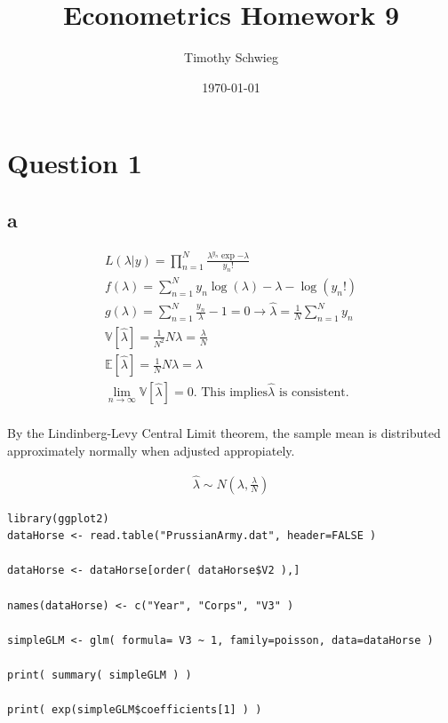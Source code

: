 \documentclass[11pt]{article}
\author{Timothy Schwieg}
\date{\today}
\title{Econometrics Homework 9}
\begin{document}
\maketitle
\section{Question 1}
\label{sec-1}
\subsection{a}
\label{sec-1-1}
\begin{align*}
L( \lambda | y ) = \prod_{n=1}^N \frac{  \lambda^{y_n} \exp{ - \lambda } }{ y_n ! }\\
f( \lambda ) = \sum_{n=1}^N y_n \log( \lambda ) - \lambda - \log( y_n ! )\\
g( \lambda ) = \sum_{n=1}^N \frac{ y_n }{ \lambda } - 1 = 0 \to \hat{\lambda} = \frac{1}{N} \sum_{n=1}^N y_n \\
\mathbb{V}[\hat{\lambda}] = \frac{1}{N^2} N \lambda = \frac{\lambda}{N}\\
\mathbb{E}[\hat{\lambda}] = \frac{1}{N} N \lambda = \lambda\\
\lim_{n \to \infty} \mathbb{V}[\hat{\lambda}] = 0. \text{ This implies
}\hat{\lambda}\text{ is consistent.}\\
\end{align*}

By the Lindinberg-Levy Central Limit theorem, the sample mean is
distributed approximately normally when adjusted appropiately. 

\begin{align*}
\hat{\lambda} \sim N( \lambda, \frac{\lambda}{N} )
\end{align*}

\begin{verbatim}
library(ggplot2)
dataHorse <- read.table("PrussianArmy.dat", header=FALSE )

dataHorse <- dataHorse[order( dataHorse$V2 ),]

names(dataHorse) <- c("Year", "Corps", "V3" )

simpleGLM <- glm( formula= V3 ~ 1, family=poisson, data=dataHorse )

print( summary( simpleGLM ) )

print( exp(simpleGLM$coefficients[1] ) )

\end{verbatim}
\end{document}
